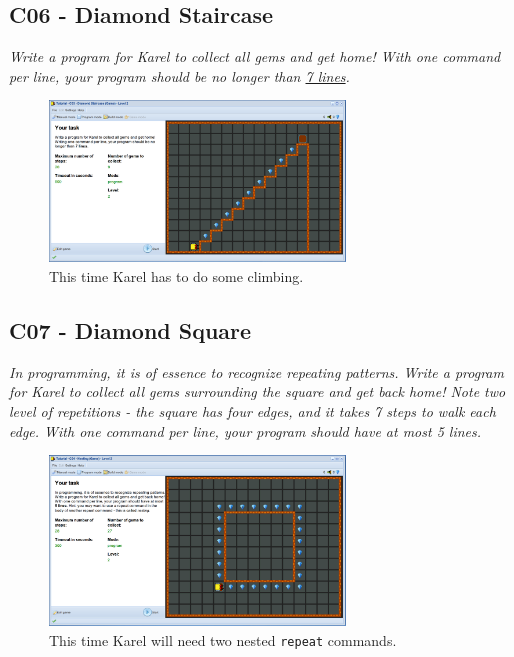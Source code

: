 \documentclass[article,A4,12pt]{llncs}
\begin{document}
\subsection{C06 - Diamond Staircase}

{\em Write a program for Karel to collect all gems and get home! 
With one command per line, your program should be no longer than \underline{7 lines}.}

\begin{figure}[!ht]
\begin{center}
\includegraphics[width=0.7\textwidth]{img/c06.png}
\end{center}
\vspace{-4mm}
\caption{This time Karel has to do some climbing.}
\label{fig:c06}
\vspace{-4mm}
\end{figure}
\noindent

\newpage

\subsection{C07 - Diamond Square}

{\em In programming, it is of essence to recognize repeating patterns. 
Write a program for Karel to collect all gems surrounding the square 
and get back home! Note two level of repetitions - the square has four 
edges, and it takes 7 steps to walk each edge. With one command per 
line, your program should have at most 5 lines.}

\begin{figure}[!ht]
\begin{center}
\includegraphics[width=0.7\textwidth]{img/c07.png}
\end{center}
\vspace{-4mm}
\caption{This time Karel will need two nested {\tt repeat} commands.}
\label{fig:c07}
\vspace{-4mm}
\end{figure}
\noindent
\end{document}
